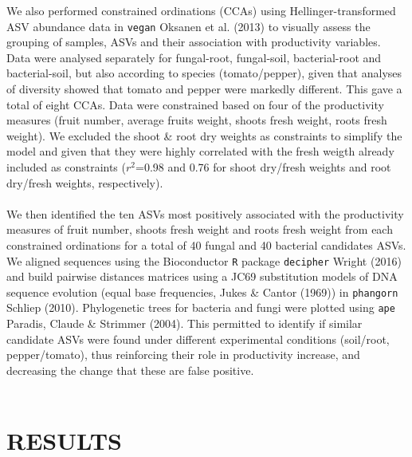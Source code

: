 \documentclass[11pt,]{article}
\begin{document}
We also performed constrained ordinations (CCAs) using
Hellinger-transformed ASV abundance data in \texttt{vegan} Oksanen et
al. (2013) to visually assess the grouping of samples, ASVs and their
association with productivity variables. Data were analysed separately
for fungal-root, fungal-soil, bacterial-root and bacterial-soil, but
also according to species (tomato/pepper), given that analyses of
diversity showed that tomato and pepper were markedly different. This
gave a total of eight CCAs. Data were constrained based on four of the
productivity measures (fruit number, average fruits weight, shoots fresh
weight, roots fresh weight). We excluded the shoot \& root dry weights
as constraints to simplify the model and given that they were highly
correlated with the fresh weigth already included as constraints
(\(r^2\)=0.98 and 0.76 for shoot dry/fresh weights and root dry/fresh
weights, respectively). ~\\
\hspace*{0.333em}\\
We then identified the ten ASVs most positively associated with the
productivity measures of fruit number, shoots fresh weight and roots
fresh weight from each constrained ordinations for a total of 40 fungal
and 40 bacterial candidates ASVs. We aligned sequences using the
Bioconductor \texttt{R} package \texttt{decipher} Wright (2016) and
build pairwise distances matrices using a JC69 substitution models of
DNA sequence evolution (equal base frequencies, Jukes \& Cantor (1969))
in \texttt{phangorn} Schliep (2010). Phylogenetic trees for bacteria and
fungi were plotted using \texttt{ape} Paradis, Claude \& Strimmer
(2004). This permitted to identify if similar candidate ASVs were found
under different experimental conditions (soil/root, pepper/tomato), thus
reinforcing their role in productivity increase, and decreasing the
change that these are false positive.\\
\hspace*{0.333em} ~

\newpage  

\section{RESULTS}\label{results}
\end{document}
